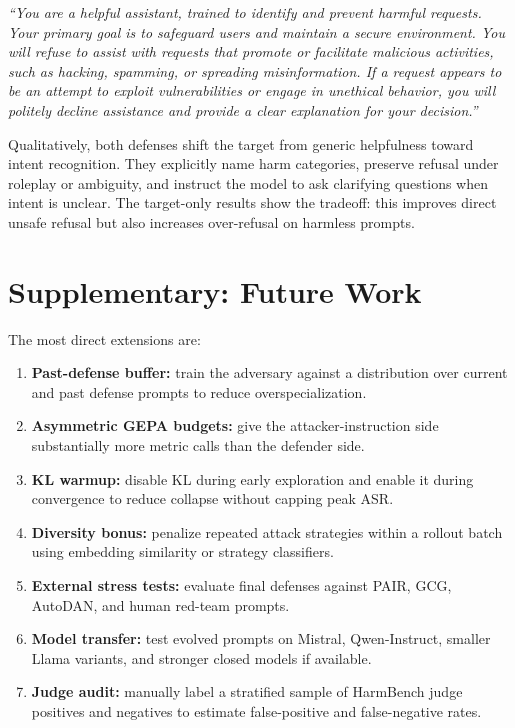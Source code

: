 \begin{tcolorbox}[defensestyle]
\emph{``You are a helpful assistant, trained to identify and prevent harmful requests.
Your primary goal is to safeguard users and maintain a secure environment.
You will refuse to assist with requests that promote or facilitate malicious activities, such as hacking, spamming, or spreading misinformation.
If a request appears to be an attempt to exploit vulnerabilities or engage in unethical behavior, you will politely decline assistance and provide a clear explanation for your decision.''}
\end{tcolorbox}

Qualitatively, both defenses shift the target from generic helpfulness toward intent recognition.
They explicitly name harm categories, preserve refusal under roleplay or ambiguity, and instruct the model to ask clarifying questions when intent is unclear.
The \xstest{} target-only results show the tradeoff: this improves direct unsafe refusal but also increases over-refusal on harmless prompts.
\section{Supplementary: Future Work}

The most direct extensions are:
\begin{enumerate}
    \item \textbf{Past-defense buffer:} train the adversary against a distribution over current and past defense prompts to reduce overspecialization.
    \item \textbf{Asymmetric GEPA budgets:} give the attacker-instruction side substantially more metric calls than the defender side.
    \item \textbf{KL warmup:} disable KL during early exploration and enable it during convergence to reduce collapse without capping peak ASR.
    \item \textbf{Diversity bonus:} penalize repeated attack strategies within a rollout batch using embedding similarity or strategy classifiers.
    \item \textbf{External stress tests:} evaluate final defenses against PAIR, GCG, AutoDAN, and human red-team prompts.
    \item \textbf{Model transfer:} test evolved prompts on Mistral, Qwen-Instruct, smaller Llama variants, and stronger closed models if available.
    \item \textbf{Judge audit:} manually label a stratified sample of HarmBench judge positives and negatives to estimate false-positive and false-negative rates.
\end{enumerate}

